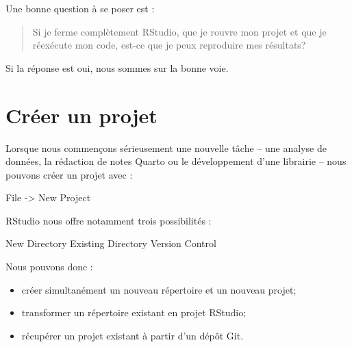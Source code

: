 \documentclass[
  letterpaper,
  DIV=11,
  numbers=noendperiod]{scrreprt}
\newenvironment{Shaded}{\begin{snugshade}}{\end{snugshade}}
\newcommand{\NormalTok}[1]{\textcolor[rgb]{0.00,0.23,0.31}{#1}}
\providecommand{\tightlist}{%
  \setlength{\itemsep}{0pt}\setlength{\parskip}{0pt}}\usepackage{longtable,booktabs,array}
\begin{document}
\begin{tcolorbox}[enhanced jigsaw, arc=.35mm, title=\textcolor{quarto-callout-note-color}{\faInfo}\hspace{0.5em}{Reproductibilité}, colback=white, left=2mm, rightrule=.15mm, toptitle=1mm, opacityback=0, bottomtitle=1mm, breakable, colframe=quarto-callout-note-color-frame, coltitle=black, toprule=.15mm, titlerule=0mm, opacitybacktitle=0.6, bottomrule=.15mm, colbacktitle=quarto-callout-note-color!10!white, leftrule=.75mm]

Une bonne question à se poser est :

\begin{quote}
Si je ferme complètement RStudio, que je rouvre mon projet et que je
réexécute mon code, est-ce que je peux reproduire mes résultats?
\end{quote}

Si la réponse est oui, nous sommes sur la bonne voie.

\end{tcolorbox}

\section{Créer un projet}\label{cruxe9er-un-projet}

Lorsque nous commençons sérieusement une nouvelle tâche -- une analyse
de données, la rédaction de notes Quarto ou le développement d'une
librairie -- nous pouvons créer un projet avec :

\begin{Shaded}
\begin{Highlighting}[]
\NormalTok{File {-}\textgreater{} New Project}
\end{Highlighting}
\end{Shaded}

RStudio nous offre notamment trois possibilités :

\begin{Shaded}
\begin{Highlighting}[]
\NormalTok{New Directory}
\NormalTok{Existing Directory}
\NormalTok{Version Control}
\end{Highlighting}
\end{Shaded}

Nous pouvons donc :

\begin{itemize}
\tightlist
\item
  créer simultanément un nouveau répertoire et un nouveau projet;
\item
  transformer un répertoire existant en projet RStudio;
\item
  récupérer un projet existant à partir d'un dépôt Git.
\end{itemize}
\end{document}
